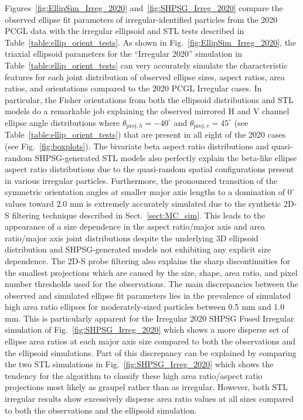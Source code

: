 \documentclass[amt, manuscript]{copernicus}
\begin{document}
Figures~\ref{fig:EllipSim_Irreg_2020} and~\ref{fig:SHPSG_Irreg_2020} compare the observed ellipse fit parameters of irregular-identified particles from the 2020 PCGL data with the irregular ellipsoid and STL tests described in Table~\ref{table:ellip_orient_tests}.
 As shown in Fig.~\ref{fig:EllipSim_Irreg_2020}, the triaxial ellipsoid parameters for the ``Irregular 2020'' simulation in Table~\ref{table:ellip_orient_tests} can very accurately simulate the characteristic features for each joint distribution of observed ellipse sizes, aspect ratios, area ratios, and orientations compared to the 2020 PCGL Irregular cases. In particular, the Fisher orientations from both the ellipsoid distributions and STL models do a remarkable job explaining the observed mirrored H and V channel ellipse angle distributions where $\theta_{\mathrm{proj},h} = -40^{\circ}$ and $\theta_{\mathrm{proj},v} = 45^{\circ}$ (see Table~\ref{table:ellip_orient_tests}) that are present in all eight of the 2020 cases (see Fig.~\ref{fig:boxplots}). The bivariate beta aspect ratio distributions and quasi-random SHPSG-generated STL models also perfectly explain the beta-like ellipse aspect ratio distributions due to the quasi-random spatial configurations present in various irregular particles. Furthermore, the pronounced transition of the symmetric orientation angles at smaller major axis lengths to a domination of $0^{\circ}$ values toward $2.0$ mm is extremely accurately simulated due to the synthetic 2D-S filtering technique described in Sect.~\ref{sect:MC_sim}. This leads to the appearance of a size dependence in the aspect ratio/major axis and area ratio/major axis joint distributions despite the underlying 3D ellipsoid distribution and SHPSG-generated models not exhibiting any explicit size dependence. The 2D-S probe filtering also explains the sharp discontinuities for the smallest projections which are caused by the size, shape, area ratio, and pixel number thresholds used for the observations. The main discrepancies between the observed and simulated ellipse fit parameters lies in the prevalence of simulated high area ratio ellipses for moderately-sized particles between 0.5 mm and 1.0 mm. This is particularly apparent for the Irregular 2020 SHPSG Fused Irregular simulation of Fig.~\ref{fig:SHPSG_Irreg_2020} which shows a more disperse set of ellipse area ratios at each major axis size compared to both the observations and the ellipsoid simulations. Part of this discrepancy can be explained by comparing the two STL simulations in Fig.~\ref{fig:SHPSG_Irreg_2020} which shows the tendency for the \citet{Schima2024} algorithm to classify these high area ratio/aspect ratio projections most likely as graupel rather than as irregular. However, both STL irregular results show excessively disperse area ratio values at all sizes compared to both the observations and the ellipsoid simulation.  
 
\end{document}
